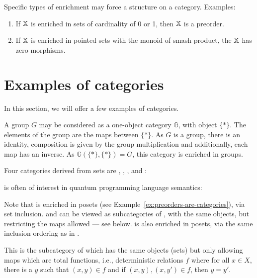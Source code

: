 Specific types of enrichment may force a structure on a category. Examples:
\begin{enumerate}
 \item If $\mathbb{X}$ is enriched in sets of cardinality of 0 or 1, then $\mathbb{X}$ is a preorder.
 \item If $\mathbb{X}$ is enriched in pointed sets with the monoid of smash product, the $\mathbb{X}$ has zero morphisms.
\end{enumerate}


\section{Examples of categories} %
\label{sub:examples_of_categories}
In this section, we will offer a few examples of categories.

\begin{example}
  A group $G$ may be considered as a one-object category $\mathbb{G}$, with object $\{*\}$. The elements of the
  group are the maps between $\{*\}$. As $G$ is a group, there is an identity, composition is given
  by the group multiplication and additionally, each map has an inverse. As $\mathbb{G}(\{*\},\{*\})
  = G$, this category is enriched in groups.
\end{example}

Four categories derived from sets are \rel, \sets, \Par, and \pinj:

\begin{example}[\rel]\label{ex:category_rel}
\rel is often of interest in quantum programming language semantics:
\end{example}


Note that \rel is enriched in posets (see Example~\ref{ex:preorders-are-categories}), via set
inclusion. \sets and \Par can be viewed as subcategories of \rel, with the same objects, but
restricting the maps allowed --- see below. \Par is also enriched in posets, via the same inclusion
ordering as in \rel.

\begin{example}[\sets]\label{ex:category_sets}
This is the subcategory of \rel which has the same  objects (sets) but only allowing maps which are
total functions, i.e., deterministic relations $f$ where for all $x\in X$, there is a $y$ such
that $(x,y)\in f$ and if $(x,y), (x,y') \in f$, then $y = y'$.
\end{example}

